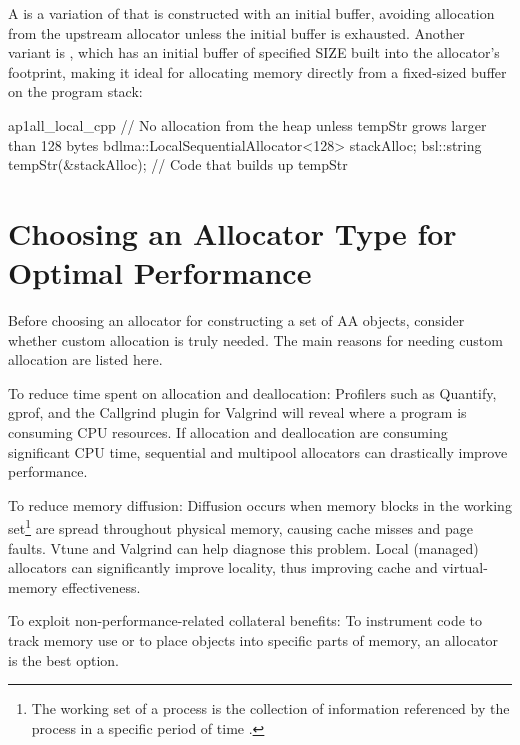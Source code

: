 A  is a variation of
 that is constructed with an initial buffer, avoiding
allocation from the upstream allocator unless the initial buffer is exhausted.
Another variant is , which has an
initial buffer of specified SIZE built into the allocator’s footprint, making it ideal
for allocating memory directly from a fixed-sized buffer on the program stack:
\begin{cppcodeblock}{ap1all_local_cpp}
    // No allocation from the heap unless tempStr grows larger than 128 bytes
    bdlma::LocalSequentialAllocator<128> stackAlloc;
    bsl::string tempStr(&stackAlloc);
    // Code that builds up tempStr
\end{cppcodeblock}

\section{Choosing an Allocator Type for Optimal Performance}

Before choosing an allocator for constructing a set of AA objects, consider
whether custom allocation is truly needed. The main reasons for needing
custom allocation are listed here.

\begin{description}
\item{To reduce time spent on allocation and deallocation}: Profilers such
as Quantify, gprof, and the Callgrind plugin for Valgrind will reveal where
a program is consuming CPU resources. If allocation and deallocation are
consuming significant CPU time, sequential and multipool allocators can
drastically improve performance.

\item{To reduce memory diffusion}: Diffusion occurs when memory blocks in
the working set\footnote{The working set of a process is the collection of information referenced by the process in a
specific period of time \cite{denning68}.}
are spread throughout physical memory, causing cache
misses and page faults. Vtune and Valgrind can help diagnose this
problem. Local (managed) allocators can significantly improve locality,
thus improving cache and virtual-memory effectiveness.

\item{To exploit non-performance-related collateral benefits}: To instrument
code to track memory use or to place objects into specific parts of
memory, an allocator is the best option.

\end{description}

